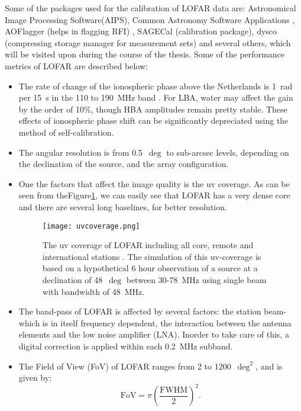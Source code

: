 \documentclass[../main/thesis_msc.tex]{subfiles}
\begin{document}
\noindent Some of the packages used for the calibration of LOFAR data are: Astronomical Image Processing Software(AIPS), Common Astronomy Software Applications \citep[CASA ;][]{casa}, AOFlagger (helps in flagging RFI) \citep{aoflagger}, SAGECal (calibration package), dysco (compressing storage manager for measurement sets) and several others, which will be visited upon during the course of the thesis.
Some of the performance metrics of LOFAR are described below:
\begin{itemize}
\item The rate of change of the ionospheric phase above the Netherlands is 1~rad per 15~s in the 110 to 190~MHz band \citep{LOFAR}. For LBA, water may affect the gain by the order of 10\%,  though HBA amplitudes remain pretty stable. These effects of ionospheric phase shift can be significantly depreciated using the method of self-calibration. 
\item The angular resolution is from 0.5~$\deg$  to sub-arcsec levels, depending on the declination of the source, and the array configuration.
\item One the factors that affect the image quality is the uv coverage. As can be seen from theFigure\ref{uv}, we can easily see that LOFAR has a very dense core and there are several long baselines, for better resolution.
\begin{figure}
\centering
\texttt{[image: uvcoverage.png]}
\caption{The uv coverage of LOFAR including all core, remote and international stations \citep{LOFAR}. The simulation of this uv-coverage is based on a hypothetical 6 hour observation of a source at a declination of 48~$\deg$ between 30-78~MHz using single beam with bandwidth of 48~MHz.}
\label{uv}
\end{figure}
\item The band-pass of LOFAR is affected by several factors: the station beam- which is in itself frequency dependent, the interaction between the antenna elements and the low noise amplifier (LNA). Inorder to take care of this, a digital correction is applied within each 0.2~MHz subband.
\item The Field of View (FoV) of LOFAR ranges from 2 to 1200~$\deg ^2$, and is given by:
\begin{equation}
\textrm{FoV}=\pi\left(\frac{\textrm{FWHM}}{2}\right)^2.
\end{equation}
\end{itemize}
\end{document}
